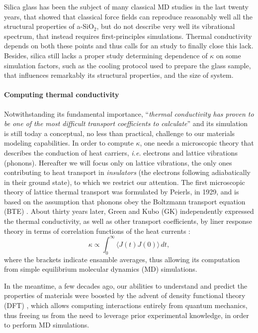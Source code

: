 Silica glass has been the subject of many classical MD studies in the last twenty years, that showed that classical force fields can reproduce reasonably well all the structural properties of a-SiO$_2$, but do not describe very well its vibrational spectrum, that instead requires first-principles simulations. 
Thermal conductivity depends on both these points and thus calls for an \abinitio study to finally close this lack.
Besides, silica still lacks a proper study determining dependence of $\kappa$ on some simulation factors, such as the cooling protocol used to prepare the glass sample, that influences remarkably its structural properties, and the size of system. 


\paragraph{Computing thermal conductivity}
Notwithstanding its fundamental importance, ``\emph{thermal conductivity has proven to be one of the most difficult transport coefficients to calculate}'' \cite{Evans1990} and its simulation is still today a conceptual, no less than practical, challenge to our materials modeling capabilities. 
In order to compute $\kappa$, one needs a microscopic theory that describes the conduction of heat carriers, \emph{i.e.} electrons and lattice vibrations (phonons). Hereafter we will focus only on lattice vibrations, the only ones contributing to heat transport in \emph{insulators} (the electrons following adiabatically in their ground state), to which we restrict our attention. 
The first microscopic theory of lattice thermal transport was formulated by Peierls, in 1929, and is based on the assumption that phonons obey the Boltzmann transport equation (BTE) \cite{Peierls1929}. 
About thirty years later, Green and Kubo (GK) independently expressed the thermal conductivity, as well as other transport coefficients, by liner response theory in terms of correlation functions of the heat currents \cite{Green1952,Green1954,Kubo1957a,Kubo1957b,Zwanzig1965}:
\begin{equation}
    \kappa \propto \int_{0}^{\infty}\!\langle{J}(t){J}(0)\rangle\, dt, \label{eq:GK-intro}
\end{equation}
where the brackets indicate ensamble averages, thus allowing its computation from simple equilibrium molecular dynamics (MD) simulations. 

In the meantime, a few decades ago, our abilities to understand and predict the properties of materials were boosted by the advent of density functional theory (DFT) \cite{Hohenberg1964,Kohn1965,Martin2008}, which allows computing interactions entirely from quantum mechanics, thus freeing us from the need to leverage prior experimental knowledge, in order to perform MD simulations. 

